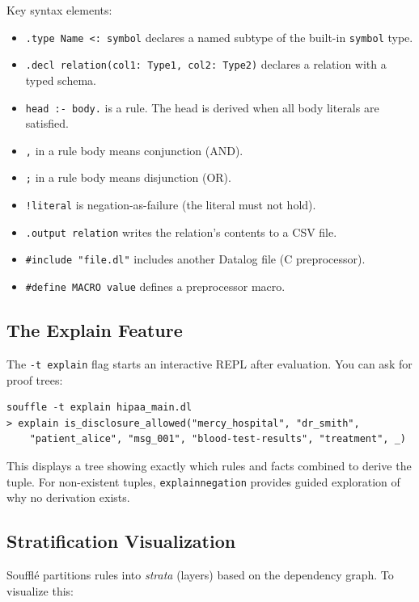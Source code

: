 \documentclass[11pt,letterpaper]{article}
\begin{document}
Key syntax elements:
\begin{itemize}
  \item \texttt{.type Name <: symbol} declares a named subtype of the built-in \texttt{symbol} type.
  \item \texttt{.decl relation(col1: Type1, col2: Type2)} declares a relation with a typed schema.
  \item \texttt{head :- body.} is a rule. The head is derived when all body literals are satisfied.
  \item \texttt{,} in a rule body means conjunction (AND).
  \item \texttt{;} in a rule body means disjunction (OR).
  \item \texttt{!literal} is negation-as-failure (the literal must not hold).
  \item \texttt{.output relation} writes the relation's contents to a CSV file.
  \item \texttt{\#include "file.dl"} includes another Datalog file (C preprocessor).
  \item \texttt{\#define MACRO value} defines a preprocessor macro.
\end{itemize}

\subsection{The Explain Feature}
\label{sec:explain}

The \texttt{-t explain} flag starts an interactive REPL after evaluation. You can ask for proof trees:

\begin{lstlisting}[style=bashstyle]
souffle -t explain hipaa_main.dl
> explain is_disclosure_allowed("mercy_hospital", "dr_smith",
    "patient_alice", "msg_001", "blood-test-results", "treatment", _)
\end{lstlisting}

This displays a tree showing exactly which rules and facts combined to derive the tuple. For non-existent tuples, \texttt{explainnegation} provides guided exploration of why no derivation exists.

\subsection{Stratification Visualization}

Souffl\'{e} partitions rules into \emph{strata} (layers) based on the dependency graph. To visualize this:
\end{document}
